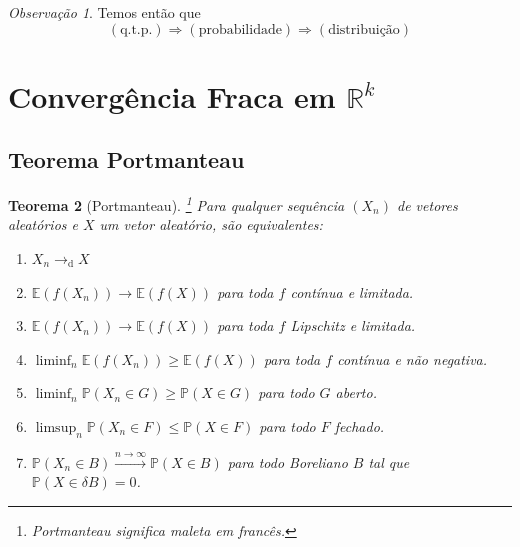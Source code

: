 \documentclass[12pt,a4paper,oneside]{book}
\newtheorem{theorem}{Teorema}[section]
\theoremstyle{definition}
\theoremstyle{remark}
\newtheorem{remark}[theorem]{Observa\c{c}\~ao}
\numberwithin{equation}{section}
\newcommand{\E}{\mathbb{E}}
\newcommand{\pr}{\mathbb{P}}
\newcommand{\rarrowlimn}{\xrightarrow{n\rightarrow \infty}}
\begin{document}
\begin{tcolorbox}[colback = yellow!60]
\begin{remark}
Temos então que 
$$(\textrm{q.t.p.}) \Rightarrow (\textrm{probabilidade}) \Rightarrow (\textrm{distribuição}) $$
\end{remark}
\end{tcolorbox}

\newpage
\section{Convergência Fraca em $\mathbb{R}^k$}

\subsection{Teorema Portmanteau}
\begin{tcolorbox}
\begin{theorem}[Portmanteau]\label{teorema portmanteau}\footnote{Portmanteau significa maleta em francês.} Para qualquer sequência $(X_n)$ de vetores aleatórios e $X$ um vetor aleatório, são equivalentes:
\begin{enumerate}
\item $X_n \rightarrow_{\textrm{d}} X$
\item $\E(f(X_n))\rightarrow \E(f(X))$ para toda $f$ contínua e limitada.
\item $\E(f(X_n))\rightarrow \E(f(X))$ para toda $f$ Lipschitz e limitada.
\item $\liminf_n \E(f(X_n))\geq \E(f(X))$ para toda  $f$ contínua  e não negativa.
\item $\liminf_n \pr(X_n\in G)\geq \pr(X\in G)$ para todo $G$ aberto.
\item $\limsup_n \pr(X_n\in F)\leq \pr(X\in F)$ para todo $F$ fechado.
\item $\pr(X_n\in B)\rarrowlimn \pr(X\in B)$ para todo Boreliano $B$ tal que $\pr(X\in \delta B)=0$. 
\end{enumerate}
\end{theorem}
\end{tcolorbox}
\end{document}
